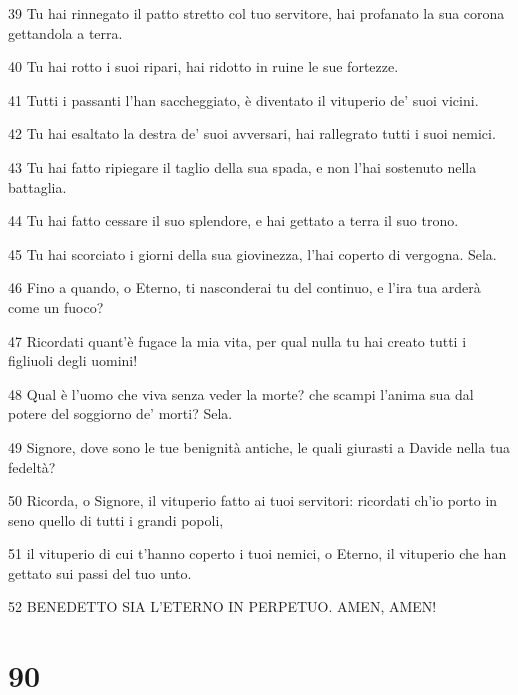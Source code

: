\par 39 Tu hai rinnegato il patto stretto col tuo servitore, hai profanato la sua corona gettandola a terra.
\par 40 Tu hai rotto i suoi ripari, hai ridotto in ruine le sue fortezze.
\par 41 Tutti i passanti l'han saccheggiato, è diventato il vituperio de' suoi vicini.
\par 42 Tu hai esaltato la destra de' suoi avversari, hai rallegrato tutti i suoi nemici.
\par 43 Tu hai fatto ripiegare il taglio della sua spada, e non l'hai sostenuto nella battaglia.
\par 44 Tu hai fatto cessare il suo splendore, e hai gettato a terra il suo trono.
\par 45 Tu hai scorciato i giorni della sua giovinezza, l'hai coperto di vergogna. Sela.
\par 46 Fino a quando, o Eterno, ti nasconderai tu del continuo, e l'ira tua arderà come un fuoco?
\par 47 Ricordati quant'è fugace la mia vita, per qual nulla tu hai creato tutti i figliuoli degli uomini!
\par 48 Qual è l'uomo che viva senza veder la morte? che scampi l'anima sua dal potere del soggiorno de' morti? Sela.
\par 49 Signore, dove sono le tue benignità antiche, le quali giurasti a Davide nella tua fedeltà?
\par 50 Ricorda, o Signore, il vituperio fatto ai tuoi servitori: ricordati ch'io porto in seno quello di tutti i grandi popoli,
\par 51 il vituperio di cui t'hanno coperto i tuoi nemici, o Eterno, il vituperio che han gettato sui passi del tuo unto.
\par 52 BENEDETTO SIA L'ETERNO IN PERPETUO. AMEN, AMEN!

\chapter{90}

